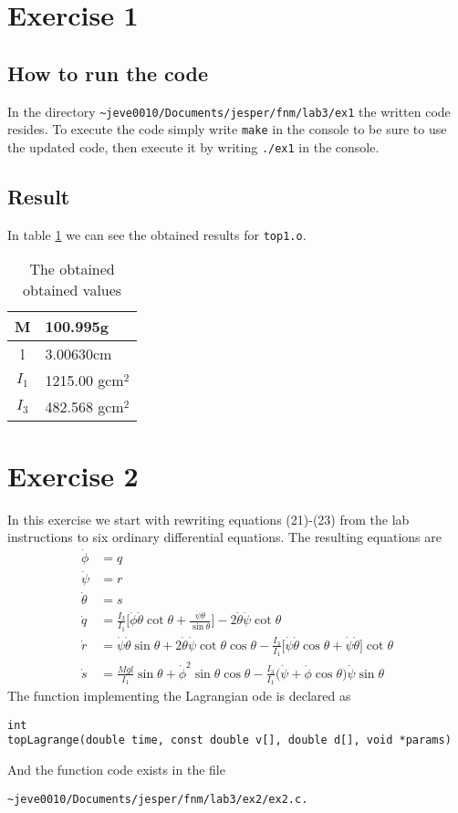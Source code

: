 \documentclass[11pt]{article}
\begin{document}
\section{Exercise 1}
\subsection{How to run the code}
In the directory \verb+~jeve0010/Documents/jesper/fnm/lab3/ex1+ the written code resides. To execute the code simply write \verb+make+ in the console to be sure to use the updated code, then execute it by writing \verb+./ex1+ in the console.

\subsection{Result}
In table \ref{table:ex1Res} we can see the obtained results for \verb+top1.o+.
\begin{table}[h]\center\Large
  \caption{The obtained obtained values}
  \begin{tabular}{c|l}
  M & 100.995g \\ \hline
  l & 3.00630cm \\ \hline
  $I_1$ & 1215.00 gcm$^2$ \\ \hline
  $I_3$ & 482.568 gcm$^2$ 
  \end{tabular}
  \label{table:ex1Res}
\end{table}

\section{Exercise 2}
In this exercise we start with rewriting equations (21)-(23) from the lab instructions to six ordinary differential equations. The resulting equations are
\begin{align}
	\dot{\phi} &= q \\
	\dot{\psi} &= r \\
	\dot{\theta} &= s \\
	\dot{q} &= \frac{I_3}{I_1} \Bigg[ \dot{\phi}\dot{\theta}\cot{\theta} + \frac{\dot{\psi}\dot{\theta}}{\sin{\theta}} \Bigg] - 2 \dot{\theta}\dot{\psi}\cot{\theta} \\
	\dot{r} &= \dot{\psi}\dot{\theta}\sin{\theta} + 2\dot{\theta}\dot{\psi}\cot{\theta}\cos{\theta} - \frac{I_3}{I_1} \Bigg[\dot{\psi}\dot{\theta}\cos{\theta} + \dot{\psi}\dot{\theta}\Bigg]\cot{\theta}\\
	\dot{s} &= \frac{Mgl}{I_1}\sin{\theta} + \dot{\phi}^2\sin{\theta}\cos{\theta}-\frac{I_3}{I_1}\Big(\dot{\psi}+\dot{\phi}\cos{\theta}\Big)\dot{\psi}\sin{\theta}
\end{align}
The function implementing the Lagrangian ode is declared as
\begin{lstlisting}
int
topLagrange(double time, const double v[], double d[], void *params)
\end{lstlisting}
And the function code exists in the file 
\begin{verbatim}
~jeve0010/Documents/jesper/fnm/lab3/ex2/ex2.c.
\end{verbatim}
\end{document}
